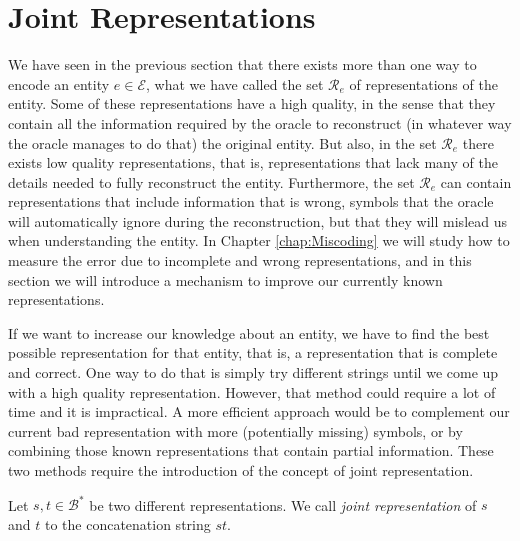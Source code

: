 %
%

\section{Joint Representations}
\label{sec:descriptions_joint_topic}

We have seen in the previous section that there exists more than one way to encode an entity $e \in \mathcal{E}$, what we have called the set $\mathcal{R}_e$ of representations of the entity. Some of these representations have a high quality, in the sense that they contain all the information required by the oracle to reconstruct (in whatever way the oracle manages to do that) the original entity. But also, in the set $\mathcal{R}_e$ there exists low quality representations, that is, representations that lack many of the details needed to fully reconstruct the entity. Furthermore, the set $\mathcal{R}_e$ can contain representations that include information that is wrong, symbols that the oracle will automatically ignore during the reconstruction, but that they will mislead us when understanding the entity. In Chapter \ref{chap:Miscoding} we will study how to measure the error due to incomplete and wrong representations, and in this section we will introduce a mechanism to improve our currently known representations.

If we want to increase our knowledge about an entity, we have to find the best possible representation for that entity, that is, a representation that is complete and correct. One way to do that is simply try different strings until we come up with a high quality representation. However, that method could require a lot of time and it is impractical. A more efficient approach would be to complement our current bad representation with more (potentially missing) symbols, or by combining those known representations that contain partial information. These two methods require the introduction of the concept of joint representation.

\begin{definition}
Let $s, t \in \mathcal{B}^\ast$ be two different representations. We call \emph{joint representation} of $s$ and $t$ to the concatenation string $st$.
\end{definition}

